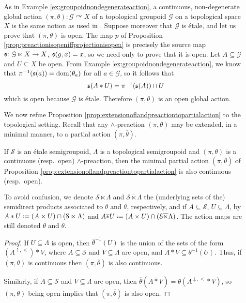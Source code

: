 \begin{example}
As in Example \ref{ex:groupoidnondegenerateaction}, a continuous, non-degenerate global action $(\pi,\theta)\colon\mathcal{G}\curvearrowright X$ of a topological groupoid $\mathcal{G}$ on a topological space $X$ is the same notion as used in \cite[Definition 3.6]{MR2969047}. Suppose moreover that $\mathcal{G}$ is étale, and let us prove that $(\pi,\theta)$ is open. The map $p$ of Proposition \ref{prop:preactionisopeniffprojectionisopen} is precisely the source map $\operatorname{\mathfrak{s}}\colon\mathcal{G}\ltimes X\to X$, $\operatorname{\mathfrak{s}}(g,x)=x$, so we need only to prove that it is open. Let $A\subseteq\mathcal{G}$ and $U\subseteq X$ be open. From Example \ref{ex:groupoidnondegenerateaction}, we know that $\pi^{-1}(\operatorname{\mathfrak{s}}(a))=\operatorname{dom}(\theta_a)$ for all $a\in\mathcal{G}$, so it follows that
\[\operatorname{\mathfrak{s}}(A\ast U)=\pi^{-1}(\operatorname{\mathfrak{s}}(A))\cap U\]
which is open because $\mathcal{G}$ is étale. Therefore $(\pi,\theta)$ is an open global action.
\end{example}

We now refine Proposition \ref{prop:extensionoflandpreactiontopartialaction} to the topological setting. Recall that any $\land$-preaction $(\pi,\theta)$ may be extended, in a minimal manner, to a partial action $(\pi,\overline{\theta})$.

\begin{proposition}
If $\mathcal{S}$ is an étale semigroupoid, $\Lambda$ is a topological semigroupoid and $(\pi,\theta)$ is a continuous (resp.\ open) $\land$-preaction, then the minimal partial action $(\pi,\overline{\theta})$ of Proposition \ref{prop:extensionoflandpreactiontopartialaction} is also continuous (resp.\ open).
\end{proposition}

To avoid confusion, we denote $\mathcal{S}\ltimes\Lambda$ and $\mathcal{S}\overline{\ltimes}\Lambda$ the (underlying sets of the) semidirect products associated to $\theta$ and $\overline{\theta}$, respectively, and if $A\subseteq\mathcal{S}$, $U\subseteq\Lambda$, by $A\ast U\defeq(A\times U)\cap(\mathcal{S}\ltimes\Lambda)$ and $A\overline{\ast}U\defeq(A\times U)\cap(\mathcal{S}\overline{\ltimes}\Lambda)$. The action maps are still denoted $\theta$ and $\overline{\theta}$.

\begin{proof}
    If $U\subseteq\Lambda$ is open, then $\overline{\theta}^{-1}(U)$ is the union of the sets of the form $(A^{\uparrow,\leq})\overline{\ast} V$, where $A\subseteq \mathcal{S}$ and $V\subseteq\Lambda$ are open, and $A\ast V\subseteq\theta^{-1}(U)$. Thus, if $(\pi,\theta)$ is continuous then $(\pi,\overline{\theta})$ is also continuous.
    
    Similarly, if $A\subseteq\mathcal{S}$ and $V\subseteq\Lambda$ are open, then $\overline{\theta}(A\overline{\ast} V)=\theta(A^{\downarrow,\leq}\ast V)$, so $(\pi,\theta)$ being open implies that $(\pi,\overline{\theta})$ is also open. \end{proof}